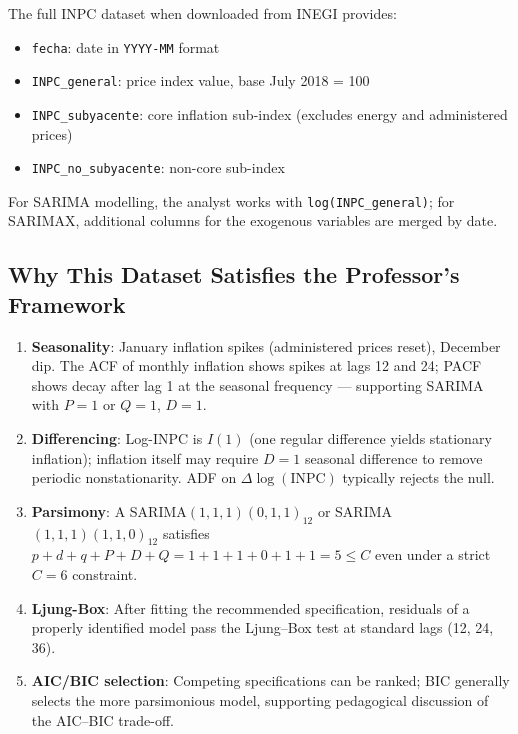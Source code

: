 \documentclass[12pt,a4paper]{article}
\begin{document}
The full INPC dataset when downloaded from INEGI provides:
\begin{itemize}[noitemsep]
  \item \texttt{fecha}: date in \texttt{YYYY-MM} format
  \item \texttt{INPC\_general}: price index value, base July 2018 = 100
  \item \texttt{INPC\_subyacente}: core inflation sub-index (excludes energy and administered prices)
  \item \texttt{INPC\_no\_subyacente}: non-core sub-index
\end{itemize}
For SARIMA modelling, the analyst works with \texttt{log(INPC\_general)}; for
SARIMAX, additional columns for the exogenous variables are merged by date.

\subsection{Why This Dataset Satisfies the Professor's Framework}

\begin{enumerate}[noitemsep]
  \item \textbf{Seasonality}: January inflation spikes (administered prices reset),
  December dip. The ACF of monthly inflation shows spikes at lags 12 and 24;
  PACF shows decay after lag 1 at the seasonal frequency — supporting SARIMA
  with $P=1$ or $Q=1$, $D=1$.
  \item \textbf{Differencing}: Log-INPC is $I(1)$ (one regular difference yields
  stationary inflation); inflation itself may require $D=1$ seasonal difference
  to remove periodic nonstationarity. ADF on $\Delta\log(\text{INPC})$ typically
  rejects the null.
  \item \textbf{Parsimony}: A SARIMA$(1,1,1)(0,1,1)_{12}$ or
  SARIMA$(1,1,1)(1,1,0)_{12}$ satisfies $p+d+q+P+D+Q = 1+1+1+0+1+1=5\le C$
  even under a strict $C=6$ constraint.
  \item \textbf{Ljung-Box}: After fitting the recommended specification, residuals
  of a properly identified model pass the Ljung--Box test at standard lags (12,
  24, 36).
  \item \textbf{AIC/BIC selection}: Competing specifications can be ranked; BIC
  generally selects the more parsimonious model, supporting pedagogical discussion
  of the AIC–BIC trade-off.
\end{enumerate}

\end{document}
